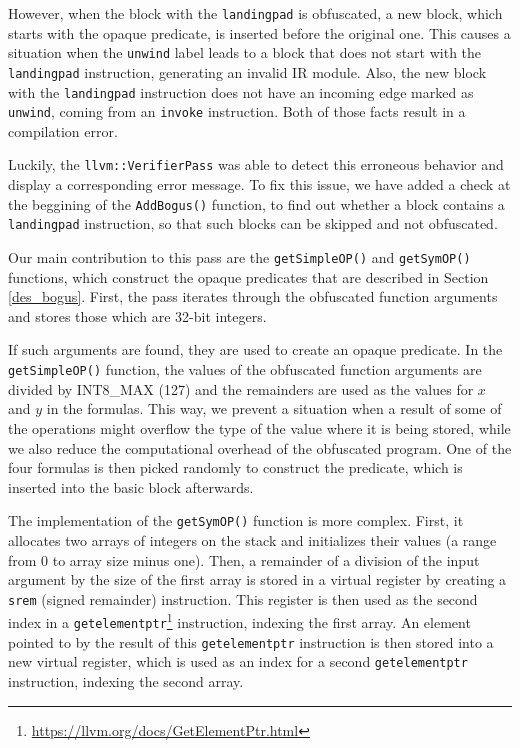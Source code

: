 \documentclass[
  digital, %
  notable,   %
  twoside, %
  nolof,     %
  nolot,     %
]{fithesis3}
\theoremstyle{definition}
\begin{document}
However, when the block with the \texttt{landingpad} is obfuscated, a new block, which starts with the opaque predicate, is inserted before the original one. This causes a situation when the \texttt{unwind} label leads to a block that does not start with the \texttt{landingpad} instruction, generating an invalid IR module. Also, the new block with the \texttt{landingpad} instruction does not have an incoming edge marked as \texttt{unwind}, coming from an \texttt{invoke} instruction. Both of those facts result in a compilation error.

Luckily, the \texttt{llvm::VerifierPass} was able to detect this erroneous behavior and display a corresponding error message. To fix this issue, we have added a check at the beggining of the \texttt{AddBogus()} function, to find out whether a block contains a \texttt{landingpad} instruction, so that such blocks can be skipped and not obfuscated. 

Our main contribution to this pass are the \texttt{getSimpleOP()} and \texttt{getSymOP()} functions, which construct the opaque predicates that are described in Section \ref{des_bogus}. First, the pass iterates through the obfuscated function arguments and stores those which are 32-bit integers. 

If such arguments are found, they are used to create an opaque predicate. In the \texttt{getSimpleOP()} function, the values of the obfuscated function arguments are divided by INT8\_MAX (127) and the remainders are used as the values for $x$ and $y$ in the formulas. This way, we prevent a situation when a result of some of the operations might overflow the type of the value where it is being stored, while we also reduce the computational overhead of the obfuscated program. One of the four formulas is then picked randomly to construct the predicate, which is inserted into the basic block afterwards. 

The implementation of the \texttt{getSymOP()} function is more complex. First, it allocates two arrays of integers on the stack and initializes their values (a range from 0 to array size minus one). Then, a remainder of a division of the input argument by the size of the first array is stored in a virtual register by creating a \texttt{srem} (signed remainder) instruction. This register is then used as the second index in a \texttt{getelementptr}\footnote{\url{https://llvm.org/docs/GetElementPtr.html}} instruction, indexing the first array. An element pointed to by the result of this \texttt{getelementptr} instruction is then stored into a new virtual register, which is used as an index for a second \texttt{getelementptr} instruction, indexing the second array. 
\end{document}
